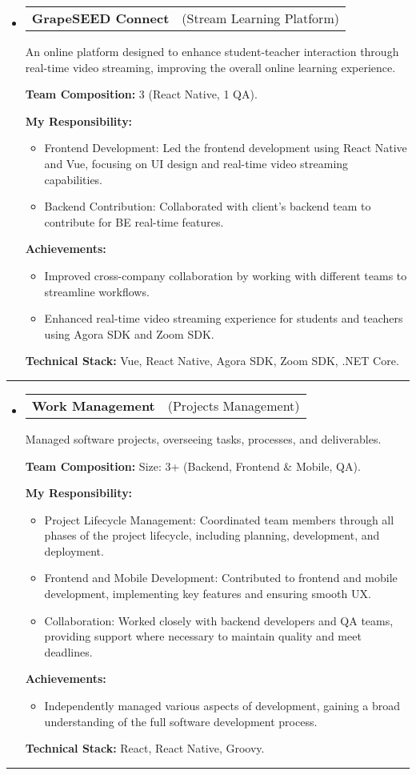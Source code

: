 \documentclass[letterpaper,11pt]{article}
\makeatletter
\newcommand{\resumeProjectTitle}[2]{
  \vspace{-2pt}\item
    \begin{tabular*}{1\textwidth}[t]{l @{\hskip 2pt} r}
      \textbf{#1} & \small #2 \\
    \end{tabular*}\vspace{2pt}
}
\newcommand{\resumeDesc}[1]{
  {#1\\ \vspace{0px}}
}
\newcommand{\resumeItem}[1]{
  \item{#1 \vspace{-2pt}}
}
\newcommand{\resumeItemListTitle}[1]{%
  \vspace{4pt} \textbf{#1} \vspace{-2pt}%
}
\newcommand{\resumeItemListStart}{\vspace{-4pt}\begin{itemize}[leftmargin=12px]}
\newcommand{\resumeItemListEnd}{\end{itemize}\vspace{-5pt}}
\newcommand{\resumeSubHeadingListStart}{\begin{itemize}[leftmargin=0pt, label={}]}
\newcommand{\resumeSubHeadingListEnd}{\end{itemize}\vspace{-5pt}}
\makeatother
\begin{document}
\resumeSubHeadingListStart
\resumeProjectTitle{GrapeSEED Connect}{(Stream Learning Platform)}
\resumeDesc{An online platform designed to enhance student-teacher interaction through real-time video streaming, improving the overall online learning experience.}
\resumeItemListTitle{Team Composition:} 3 (React Native, 1 QA).
\par
\resumeItemListTitle{My Responsibility:}
\resumeItemListStart
    \resumeItem{Frontend Development: Led the frontend development using React Native and Vue, focusing on UI design and real-time video streaming capabilities.}
    \resumeItem{Backend Contribution: Collaborated with client's backend team to contribute for BE real-time features.}
\resumeItemListEnd
\resumeItemListTitle{Achievements:}
\resumeItemListStart
    \resumeItem{Improved cross-company collaboration by working with different teams to streamline workflows.}
    \resumeItem{Enhanced real-time video streaming experience for students and teachers using Agora SDK and Zoom SDK.}
\resumeItemListEnd
\resumeItemListTitle{Technical Stack:} Vue, React Native, Agora SDK, Zoom SDK, .NET Core.
\resumeSubHeadingListEnd
\noindent\rule{\textwidth}{0.4pt}

\resumeSubHeadingListStart
\resumeProjectTitle{Work Management}{(Projects Management)}
\resumeDesc{Managed software projects, overseeing tasks, processes, and deliverables.}
\resumeItemListTitle{Team Composition:} Size: 3+ (Backend, Frontend \& Mobile, QA).
\par
\resumeItemListTitle{My Responsibility:}
\resumeItemListStart
    \resumeItem{Project Lifecycle Management: Coordinated team members through all phases of the project lifecycle, including planning, development, and deployment.}
    \resumeItem{Frontend and Mobile Development: Contributed to frontend and mobile development, implementing key features and ensuring smooth UX.}
    \resumeItem{Collaboration: Worked closely with backend developers and QA teams, providing support where necessary to maintain quality and meet deadlines.}
\resumeItemListEnd
\resumeItemListTitle{Achievements:}
\resumeItemListStart
    \resumeItem{Independently managed various aspects of development, gaining a broad understanding of the full software development process.}
\resumeItemListEnd
\resumeItemListTitle{Technical Stack:} React, React Native, Groovy.
\resumeSubHeadingListEnd
\noindent\rule{\textwidth}{0.4pt}
\end{document}
